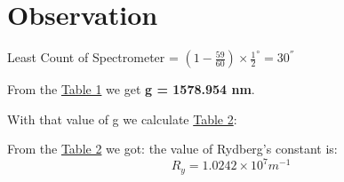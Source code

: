 \section{Observation}

    Least Count of Spectrometer = $(1-\frac{59}{60})\times \frac{1}{2}^\circ = 30^{''}$

	

	From the \hyperref[tab:1]{Table 1} we get \textbf{g = 1578.954 nm}.

	\vspace{5mm}
	\noindent With that value of g we calculate \hyperref[tab:2]{Table 2}:

	

	From the \hyperref[tab:2]{Table 2} we got: the value of Rydberg's constant is:
	$$R_y = 1.0242 \times 10^{7} m^{-1}$$